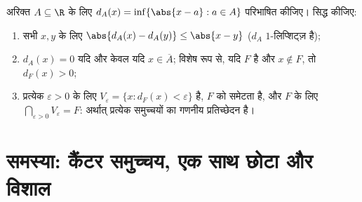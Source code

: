 \begin{exercise}[$\star\star\star$]\label{exo:b1:topology:12}
अरिक्त $A \subseteq \R$ के लिए $d_A(x) = \inf\{\abs{x - a} : a \in A\}$
परिभाषित कीजिए। सिद्ध कीजिए:
\begin{enumerate}
  \item सभी $x, y$ के लिए $\abs{d_A(x) - d_A(y)} \leq \abs{x - y}$ ($d_A$
  $1$-लिप्शिट्ज़ है);
  \item $d_A(x) = 0$ यदि और केवल यदि $x \in \overline A$; विशेष रूप से, यदि
  $F$  है और $x \notin F$, तो $d_F(x) > 0$;
  \item प्रत्येक $\varepsilon > 0$ के लिए  $V_\varepsilon = \{x :
  d_F(x) < \varepsilon\}$  है, $F$ को समेटता है, और  $F$ के लिए
  $\bigcap_{\varepsilon > 0} V_\varepsilon = F$: अर्थात् प्रत्येक   समुच्चयों का गणनीय प्रतिच्छेदन है।
\end{enumerate}
\end{exercise}

\section{समस्या: कैंटर समुच्चय, एक साथ छोटा और विशाल}

